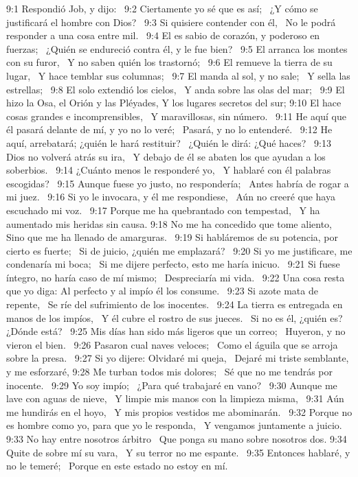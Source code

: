 9:1 Respondió Job, y dijo:  
9:2 Ciertamente yo sé que es así;  
¿Y cómo se justificará el hombre con Dios?  
9:3 Si quisiere contender con él,  
No le podrá responder a una cosa entre mil.  
9:4 El es sabio de corazón, y poderoso en fuerzas;  
¿Quién se endureció contra él, y le fue bien?  
9:5 El arranca los montes con su furor,  
Y no saben quién los trastornó;  
9:6 El remueve la tierra de su lugar,  
Y hace temblar sus columnas;  
9:7 El manda al sol, y no sale;  
Y sella las estrellas;  
9:8 El solo extendió los cielos,  
Y anda sobre las olas del mar;  
9:9 El hizo la Osa, el Orión y las Pléyades, 
Y los lugares secretos del sur; 
9:10 El hace cosas grandes e incomprensibles,  
Y maravillosas, sin número.  
9:11 He aquí que él pasará delante de mí, y yo no lo veré;  
Pasará, y no lo entenderé.  
9:12 He aquí, arrebatará; ¿quién le hará restituir?  
¿Quién le dirá: ¿Qué haces?  
9:13 Dios no volverá atrás su ira,  
Y debajo de él se abaten los que ayudan a los soberbios.  
9:14 ¿Cuánto menos le responderé yo,  
Y hablaré con él palabras escogidas?  
9:15 Aunque fuese yo justo, no respondería;  
Antes habría de rogar a mi juez.  
9:16 Si yo le invocara, y él me respondiese,  
Aún no creeré que haya escuchado mi voz.  
9:17 Porque me ha quebrantado con tempestad,  
Y ha aumentado mis heridas sin causa. 
9:18 No me ha concedido que tome aliento,  
Sino que me ha llenado de amarguras.  
9:19 Si habláremos de su potencia, por cierto es fuerte;  
Si de juicio, ¿quién me emplazará?  
9:20 Si yo me justificare, me condenaría mi boca;  
Si me dijere perfecto, esto me haría inicuo.  
9:21 Si fuese íntegro, no haría caso de mí mismo;  
Despreciaría mi vida.  
9:22 Una cosa resta que yo diga: 
Al perfecto y al impío él los consume.  
9:23 Si azote mata de repente,  
Se ríe del sufrimiento de los inocentes.  
9:24 La tierra es entregada en manos de los impíos,  
Y él cubre el rostro de sus jueces.  
Si no es él, ¿quién es? ¿Dónde está?  
9:25 Mis días han sido más ligeros que un correo;  
Huyeron, y no vieron el bien.  
9:26 Pasaron cual naves veloces;  
Como el águila que se arroja sobre la presa.  
9:27 Si yo dijere: Olvidaré mi queja,  
Dejaré mi triste semblante, y me esforzaré, 
9:28 Me turban todos mis dolores;  
Sé que no me tendrás por inocente.  
9:29 Yo soy impío;  
¿Para qué trabajaré en vano?  
9:30 Aunque me lave con aguas de nieve,  
Y limpie mis manos con la limpieza misma,  
9:31 Aún me hundirás en el hoyo,  
Y mis propios vestidos me abominarán.  
9:32 Porque no es hombre como yo, para que yo le responda,  
Y vengamos juntamente a juicio.  
9:33 No hay entre nosotros árbitro  
Que ponga su mano sobre nosotros dos. 
9:34 Quite de sobre mí su vara,  
Y su terror no me espante.  
9:35 Entonces hablaré, y no le temeré;  
Porque en este estado no estoy en mí.  
